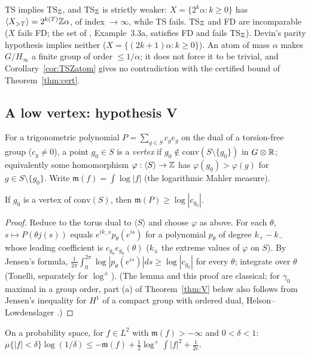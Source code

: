TS implies TS$_\mathbb Z$, and TS$_\mathbb Z$ is strictly weaker: $X=\{2^k\alpha:k\ge0\}$ has $\langle X_{>T}\rangle=2^{k(T)}\mathbb Z\alpha$, of index $\to\infty$, while TS fails. TS$_\mathbb Z$ and FD are incomparable ($X$ fails FD; the set of , Example~3.3a, satisfies FD and fails TS$_\mathbb Z$). Devin's parity hypothesis \cite[Theorem~2.3]{Devin} implies neither ($X=\{(2k+1)\alpha:k\ge0\}$). An atom of mass $\alpha$ makes $G/H_\infty$ a finite group of order $\le1/\alpha$; it does not force it to be trivial, and Corollary~\ref{cor:TSZatom} gives no contradiction with the certified bound of Theorem~\ref{thm:cert}.

\subsection{A low vertex: hypothesis V}\label{sec:V}
For a trigonometric polynomial $P=\sum_{g\in S}c_ge_g$ on the dual of a torsion-free group ($c_g\ne0$), a point $g_0\in S$ is a \emph{vertex} if $g_0\notin\mathrm{conv}(S\setminus\{g_0\})$ in $G\otimes\mathbb R$; equivalently some homomorphism $\varphi:\langle S\rangle\to\mathbb Z$ has $\varphi(g_0)>\varphi(g)$ for $g\in S\setminus\{g_0\}$. Write $\mathfrak m(f)=\int\log|f|$ (the logarithmic Mahler measure).

\begin{lemma}\label{lem:JN}
If $g_0$ is a vertex of $\mathrm{conv}(S)$, then $\mathfrak m(P)\ge\log|c_{g_0}|$.
\end{lemma}

\begin{proof}
Reduce to the torus dual to $\langle S\rangle$ and choose $\varphi$ as above. For each $\theta$, $s\mapsto P(\theta j(s))$ equals $e^{ik_-s}p_\theta(e^{is})$ for a polynomial $p_\theta$ of degree $k_+-k_-$ whose leading coefficient is $c_{g_0}e_{g_0}(\theta)$ ($k_\pm$ the extreme values of $\varphi$ on $S$). By Jensen's formula, $\frac1{2\pi}\int_0^{2\pi}\log|p_\theta(e^{is})|ds\ge\log|c_{g_0}|$ for every $\theta$; integrate over $\theta$ (Tonelli, separately for $\log^\pm$). (The lemma and this proof are classical; for $\gamma_0$ maximal in a group order, part (a) of Theorem~\ref{thm:V} below also follows from Jensen's inequality for $H^1$ of a compact group with ordered dual, Helson--Lowdenslager \cite{HL}.)
\end{proof}

\begin{lemma}\label{lem:smallball}
On a probability space, for $f\in L^2$ with $\mathfrak m(f)>-\infty$ and $0<\delta<1$: $\mu\{|f|<\delta\}\log(1/\delta)\le-\mathfrak m(f)+\frac12\log^+\int|f|^2+\frac1{2e}$.
\end{lemma}

